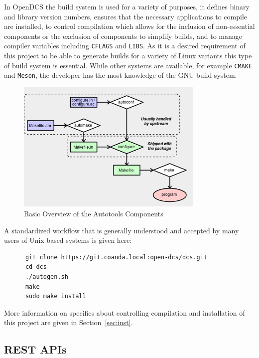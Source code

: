    In OpenDCS the build system is used for a variety of purposes, it defines
    binary and library version numbers, ensures that the necessary applications
    to compile are installed, to control compilation which allows for the
    inclusion of non-essential components or the exclusion of components to
    simplify builds, and to manage compiler variables including \texttt{CFLAGS}
    and \texttt{LIBS}. As it is a desired requirement of this project to be able
    to generate builds for a variety of Linux variants this type of build system
    is essential. While other systems are available, for example \texttt{CMAKE}
    and \texttt{Meson}, the developer has the most knowledge of the GNU build
    system.

    \begin{figure}[H]
      \includegraphics[width=0.8\textwidth,center]{figures/development/autotools-components}
      \caption{Basic Overview of the Autotools Components}\label{fig:dev-ac-comp}
    \end{figure}

    A standardized workflow that is generally understood and accepted by many
    users of Unix based systems is given here:

    \begin{lstlisting}
      git clone https://git.coanda.local:open-dcs/dcs.git
      cd dcs
      ./autogen.sh
      make
      sudo make install
    \end{lstlisting}

    More information on specifics about controlling compilation and installation
    of this project are given in Section~\ref{sec:inst}.

  \subsection{REST APIs}\label{sec:rest}

